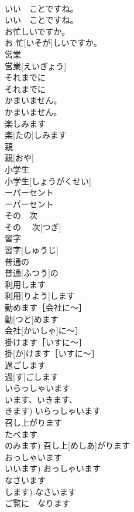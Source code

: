 \documentclass[8pt]{extreport}
\begin{document}
\begin{CJK}{UTF8}{min}
\\	いい　ことですね。	
\\	いい　ことですね。	
\\	お忙しいですか。	
\\	お 忙[いそが]しいですか。	
\\	営業	
\\	営業[えいぎょう]	
\\	それまでに	
\\	それまでに	
\\	かまいません。	
\\	かまいません。	
\\	楽しみます	
\\	楽[たの]しみます	
\\	親	
\\	親[おや]	
\\	小学生	
\\	小学生[しょうがくせい]	
\\	ーパーセント	
\\	ーパーセント	
\\	その　次	
\\	その　 次[つぎ]	
\\	習字	
\\	習字[しゅうじ]	
\\	普通の	
\\	普通[ふつう]の	
\\	利用します	
\\	利用[りよう]します	
\\	勤めます［会社に〜］	
\\	勤[つと]めます
\\	会社[かいしゃ]に〜］	
\\	掛けます［いすに〜］	
\\	掛[か]けます［いすに〜］	
\\	過ごします	
\\	過[す]ごします	
\\	いらっしゃいます	
\\	います、いきます、
\\	きます)	いらっしゃいます	
\\	召し上がります	
\\	たべます 
\\	のみます)	召し上[めしあ]がります	
\\	おっしゃいます	
\\	いいます)	おっしゃいます	
\\	なさいます	
\\	します)	なさいます	
\\	ご覧に　なります	

\end{CJK}
\end{document}
